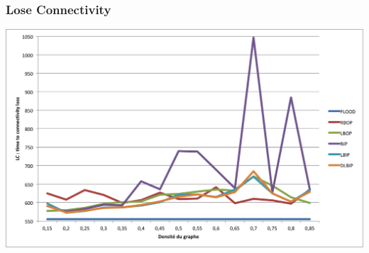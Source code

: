 \subsubsection{Lose Connectivity}
\begin{bigcenter}
\includegraphics[scale=0.89]{Simus/lc_4_10p6}
\end{bigcenter}
